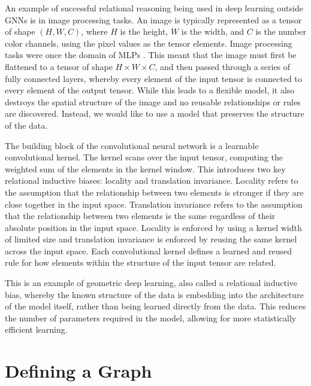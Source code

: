 An example of successful relational reasoning being used in deep learning outside GNNs is in image processing tasks.
An image is typically represented as a tensor of shape $(H, W, C)$, where $H$ is the height, $W$ is the width, and $C$ is the number color channels, using the pixel values as the tensor elements.
Image processing tasks were once the domain of MLPs .
This meant that the image must first be flattened to a tensor of shape $H \times W \times C$, and then passed through a series of fully connected layers, whereby every element of the input tensor is connected to every element of the output tensor.
While this leads to a flexible model, it also destroys the spatial structure of the image and no reusable relationships or rules are discovered.
Instead, we would like to use a model that preserves the structure of the data.

The building block of the convolutional neural network is a learnable convolutional kernel.
The kernel scans over the input tensor, computing the weighted sum of the elements in the kernel window.
This introduces two key relational inductive biases: locality and translation invariance.
Locality refers to the assumption that the relationship between two elements is stronger if they are close together in the input space.
Translation invariance refers to the assumption that the relationship between two elements is the same regardless of their absolute position in the input space.
Locality is enforced by using a kernel width of limited size and translation invariance is enforced by reusing the same kernel across the input space.
Each convolutional kernel defines a learned and reused rule for how elements within the structure of the input tensor are related.

This is an example of geometric deep learning, also called a relational inductive bias, whereby the known structure of the data is embedding into the architecture of the model itself, rather than being learned directly from the data.
This reduces the number of parameters required in the model, allowing for more statistically efficient learning.

\section{Defining a Graph}

